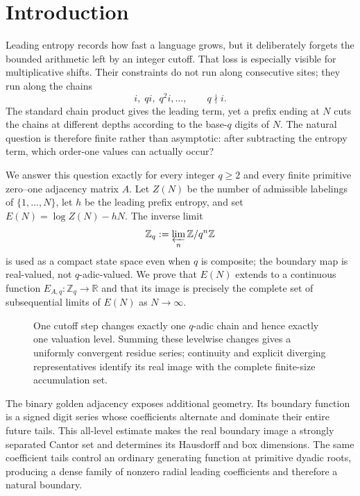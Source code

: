 \section{Introduction}
\label{sec:introduction}

Leading entropy records how fast a language grows, but it deliberately
forgets the bounded arithmetic left by an integer cutoff.  That loss is
especially visible for multiplicative shifts.  Their constraints do not run
along consecutive sites; they run along the chains
\[
  i,\;qi,\;q^2i,\ldots,\qquad q\nmid i.
\]
The standard chain product gives the leading term, yet a prefix ending at
\(N\) cuts the chains at different depths according to the base-\(q\)
digits of \(N\).  The natural question is therefore finite rather than
asymptotic: after subtracting the entropy term, which order-one values can
actually occur?

We answer this question exactly for every integer \(q\ge2\) and every finite
primitive zero--one adjacency matrix \(A\).  Let \(Z(N)\) be the number of
admissible labelings of \(\{1,\ldots,N\}\), let \(h\) be the leading prefix
entropy, and set \(E(N)=\log Z(N)-hN\).  The inverse limit
\[
  \mathbb Z_q:=\varprojlim_n \mathbb Z/q^n\mathbb Z
\]
is used as a compact state space even when \(q\) is composite; the boundary
map is real-valued, not \(q\)-adic-valued.  We prove that \(E(N)\) extends to
a continuous function \(E_{A,q}\colon\mathbb Z_q\to\mathbb R\) and that its
image is precisely the complete set of subsequential limits of \(E(N)\) as
\(N\to\infty\).

\begin{figure}[t]
  \centering
  \resizebox{\textwidth}{!}{}
  \caption{One cutoff step changes exactly one \(q\)-adic chain and hence
  exactly one valuation level.  Summing these levelwise changes gives a
  uniformly convergent residue series; continuity and explicit diverging
  representatives identify its real image with the complete finite-size
  accumulation set.}
  \label{fig:chain-boundary}
\end{figure}

The binary golden adjacency exposes additional geometry.  Its boundary
function is a signed digit series whose coefficients alternate and dominate
their entire future tails.  This all-level estimate makes the real boundary
image a strongly separated Cantor set and determines its Hausdorff and box
dimensions.  The same coefficient tails control an ordinary generating
function at primitive dyadic roots, producing a dense family of nonzero
radial leading coefficients and therefore a natural boundary.

